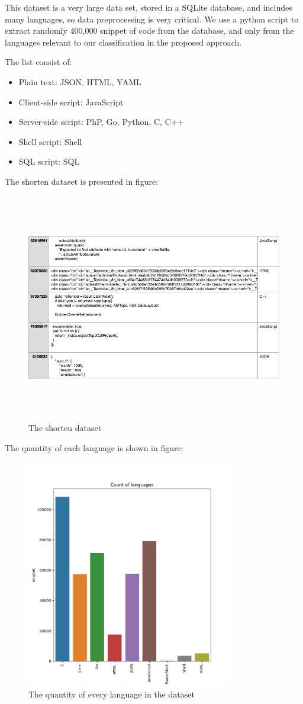 This dataset is a very large data set, stored in a SQLite database, and includes many languages, so data preprocessing is very critical. We use a python script to extract randomly 400,000 snippet of code from the database, and only from the languages relevant to our classification in the proposed approach.

The list consist of: 
\begin{itemize}
	\item Plain text: JSON, HTML, YAML
	\item Client-side script: JavaScript
	\item Server-side script: PhP, Go, Python, C, C++
	\item Shell script: Shell
	\item SQL script: SQL 
\end{itemize}

The shorten dataset is presented in figure:

\begin{figure}[!h]
	\centering
	\includegraphics[width=\linewidth, height=10cm,keepaspectratio]{figures/dataset4.png}
  \caption{The shorten dataset}
\end{figure}

\newpage
The quantity of each language is shown in figure: 
\begin{figure}[!h]
	\centering
	\includegraphics[width=\linewidth, height=10cm,keepaspectratio]{figures/dataset5.png}
  \caption{The quantity of every language in the dataset}
\end{figure}



